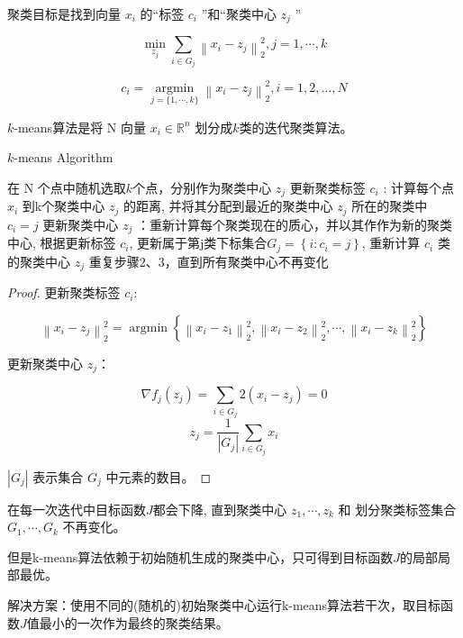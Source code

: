 聚类目标是找到向量 $ x_{i} $ 的“标签 $ c_{i} $ ”和“聚类中心 $ z_{j} $ ”

\begin{problem}
    $$ \min _{z_{j}} \sum_{i \in G_{j}}\left\|x_{i}-z_{j}\right\|_{2}^{2}, j=1, \cdots, k $$

    $$ c_{i}=\underset{j=\{1, \cdots, k\}}{\operatorname{argmin}}\left\|x_{i}-z_{j}\right\|_{2}^{2}, i=1,2, \ldots, N $$
\end{problem}

$k$-means算法是将 $ \mathrm{N} $ 向量 $ x_{i} \in \mathbb{R}^{n} $ 划分成$k$类的迭代聚类算法。

\begin{algorithm}
    \caption{$k$-means Algorithm}
    在 $ \mathrm{N} $ 个点中随机选取$k$个点，分别作为聚类中心 $ z_{j} $\;
    更新聚类标签 $ c_{i} $ : 计算每个点 $ x_{i} $ 到k个聚类中心 $ z_{j} $ 的距离, 并将其分配到最近的聚类中心 $ z_{j} $ 所在的聚类中 $ c_{i}=j $\;
    更新聚类中心 $ z_{j} $ ：重新计算每个聚类现在的质心，并以其作作为新的聚类中心, 根据更新标签 $ c_{i} $, 更新属于第j类下标集合$ G_{j}=\left\{i: c_{i}=j\right\} $, 重新计算 $ c_{i} $ 类的聚类中心 $ z_{j} $\;
    重复步骤2、3，直到所有聚类中心不再变化
\end{algorithm}

\begin{proof}
    更新聚类标签 $ c_{i} $:

    $$ \left\|x_{i}-z_{j}\right\|_{2}^{2}=\operatorname{argmin}\left\{\left\|x_{i}-z_{1}\right\|_{2}^{2},\left\|x_{i}-z_{2}\right\|_{2}^{2}, \cdots,\left\|x_{i}-z_{k}\right\|_{2}^{2}\right\} $$

    更新聚类中心 $ z_{j} $：

    $$ \nabla f_{j}\left(z_{j}\right)=\sum_{i \in G_{j}} 2\left(x_{i}-z_{j}\right)=0 $$
$$ z_{j}=\frac{1}{\left|G_{j}\right|} \sum_{i \in G_{j}} x_{i} $$

$ \left|G_{j}\right| $ 表示集合 $ G_{j} $ 中元素的数目。
\end{proof}

在每一次迭代中目标函数$J$都会下降, 直到聚类中心 $ z_{1}, \cdots, z_{k} $ 和 划分聚类标签集合 $ G_{1}, \cdots, G_{k} $ 不再变化。

但是k-means算法依赖于初始随机生成的聚类中心，只可得到目标函数$J$的局部局部最优。

解决方案：使用不同的(随机的)初始聚类中心运行k-means算法若干次，取目标函数$J$值最小的一次作为最终的聚类结果。

